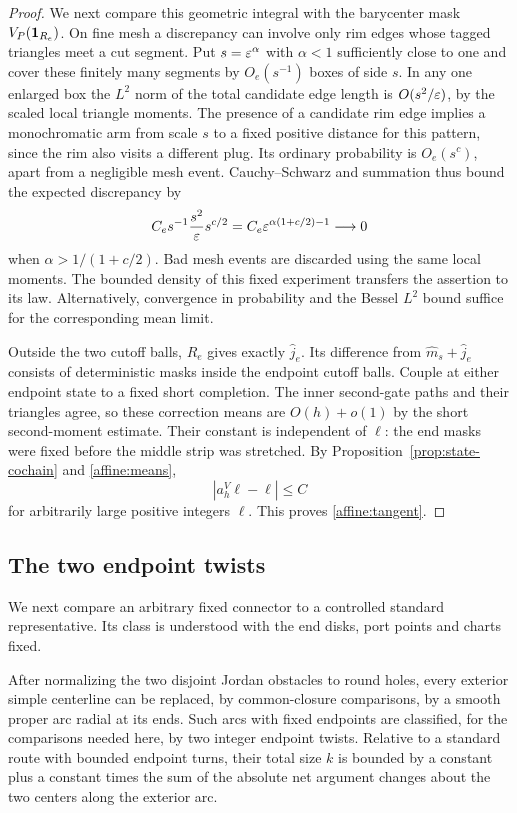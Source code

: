 \begin{proof}
We next compare this geometric integral with the barycenter mask
$V_P(\mathbf 1_{R_e})$.  On fine mesh a discrepancy can involve only rim
edges whose tagged triangles meet a cut segment.  Put $s=\varepsilon^\alpha$
with $\alpha<1$ sufficiently close to one and cover these finitely many
segments by $O_e(s^{-1})$ boxes of side $s$.  In any one enlarged box the
$L^2$ norm of the total candidate edge length is $O(s^2/\varepsilon)$, by the
scaled local triangle moments.  The presence of a candidate rim edge
implies a monochromatic arm from scale $s$ to a fixed positive distance
for this pattern, since the rim also visits a different plug.  Its
ordinary probability is $O_e(s^c)$, apart from a negligible mesh event.
Cauchy--Schwarz and summation thus bound the expected discrepancy by
\[
 C_e s^{-1}\frac{s^2}{\varepsilon}s^{c/2}
       =C_e\varepsilon^{\alpha(1+c/2)-1}\longrightarrow0
\]
when $\alpha>1/(1+c/2)$.  Bad mesh events are discarded using the same
local moments.  The bounded density of this fixed experiment transfers
the assertion to its law.  Alternatively, convergence in probability
and the Bessel $L^2$ bound suffice for the corresponding mean limit.

Outside the two cutoff balls, $R_e$ gives exactly $\widehat j_e$.
Its difference from $\widehat m_s+\widehat j_e$ consists of deterministic
masks inside the endpoint cutoff balls.  Couple at either endpoint state
to a fixed short completion.  The inner second-gate paths and their
triangles agree, so these correction means are $O(h)+o(1)$ by the short
second-moment estimate.  Their constant is independent of $\ell$:
the end masks were fixed before the middle strip was stretched.  By
Proposition~\ref{prop:state-cochain} and \eqref{affine:means},
\[
 |a_h^V\ell-\ell|\le C
\]
for arbitrarily large positive integers $\ell$.  This proves
\eqref{affine:tangent}.
\end{proof}

\subsection{The two endpoint twists}

We next compare an arbitrary fixed connector to a controlled standard
representative.  Its class is understood with the end disks, port
points and charts fixed.

\begin{lemma}\label{lemma:two-twists}
After normalizing the two disjoint Jordan obstacles to round holes,
every exterior simple centerline can be replaced, by common-closure
comparisons, by a smooth proper arc radial at its ends.  Such arcs with
fixed endpoints are classified, for the comparisons needed here, by two
integer endpoint twists.  Relative to a standard route with bounded
endpoint turns, their total size $k$ is bounded by a constant plus a
constant times the sum of the absolute net argument changes about the
two centers along the exterior arc.
\end{lemma}

